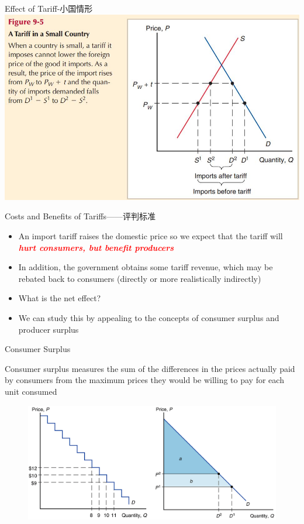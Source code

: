 \documentclass[10pt,hyperref={CJKbookmarks=true},xcolor=dvipsnames,aspectratio=169]{beamer}
\begin{document}
\begin{frame}{Effect of Tariff-小国情形}
 \centering	\includegraphics[scale=0.4 ]{fig/instruments/small}
\end{frame}

\begin{frame}{Costs and Benefits of Tariffs——评判标准}

\begin{itemize}
\item An import tariff raises the domestic price so we expect that the tariff
will \textbf{\textcolor{red}{\emph{hurt consumers, but benefit producers}}} 
\item In addition, the government obtains some tariff revenue, which may
be rebated back to consumers (directly or more realistically indirectly) 
\item What is the net effect? 
\item We can study this by appealing to the concepts of consumer surplus
and producer surplus
\end{itemize}
\end{frame}

\begin{frame}{Consumer Surplus}

\begin{block}{Consumer surplus measures the sum of the differences in the prices
actually paid by consumers from the maximum prices they would be willing
to pay for each unit consumed}


\begin{figure}
\includegraphics[scale=0.3]{fig/instruments/lec07-8}
\end{figure}



\end{block}
\end{frame}
\end{document}
